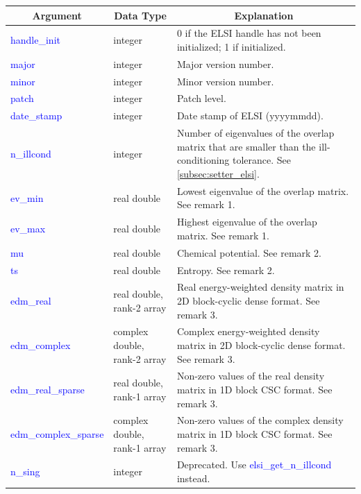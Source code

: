 \documentclass{report}
\begin{document}
\begin{tabular}[]{|p{30mm}|p{45mm}|p{90mm}|}
\hline
\multicolumn{1}{|c|}{\textbf{Argument}} & \multicolumn{1}{c|}{\textbf{Data Type}} & \multicolumn{1}{c|}{\textbf{Explanation}}\\
\hline
\textcolor{blue}{handle\_init}         & integer                      & 0 if the ELSI handle has not been initialized; 1 if initialized.\\
\hline
\textcolor{blue}{major}                & integer                      & Major version number.\\
\hline
\textcolor{blue}{minor}                & integer                      & Minor version number.\\
\hline
\textcolor{blue}{patch}                & integer                      & Patch level.\\
\hline
\textcolor{blue}{date\_stamp}          & integer                      & Date stamp of ELSI (yyyymmdd).\\
\hline
\textcolor{blue}{n\_illcond}           & integer                      & Number of eigenvalues of the overlap matrix that are smaller than the ill-conditioning tolerance.  See \ref{subsec:setter_elsi}.\\
\hline
\textcolor{blue}{ev\_min}              & real double                  & Lowest eigenvalue of the overlap matrix.  See remark 1.\\
\hline
\textcolor{blue}{ev\_max}              & real double                  & Highest eigenvalue of the overlap matrix.  See remark 1.\\
\hline
\textcolor{blue}{mu}                   & real double                  & Chemical potential.  See remark 2.\\
\hline
\textcolor{blue}{ts}                   & real double                  & Entropy.  See remark 2.\\
\hline
\textcolor{blue}{edm\_real}            & real double, rank-2 array    & Real energy-weighted density matrix in 2D block-cyclic dense format.  See remark 3.\\
\hline
\textcolor{blue}{edm\_complex}         & complex double, rank-2 array & Complex energy-weighted density matrix in 2D block-cyclic dense format.  See remark 3.\\
\hline
\textcolor{blue}{edm\_real\_sparse}    & real double, rank-1 array    & Non-zero values of the real density matrix in 1D block CSC format.  See remark 3.\\
\hline
\textcolor{blue}{edm\_complex\_sparse} & complex double, rank-1 array & Non-zero values of the complex density matrix in 1D block CSC format.  See remark 3.\\
\hline
\textcolor{blue}{n\_sing}              & integer                      & Deprecated.  Use \textcolor{blue}{elsi\_get\_n\_illcond} instead.\\
\hline
\end{tabular}
\end{document}
